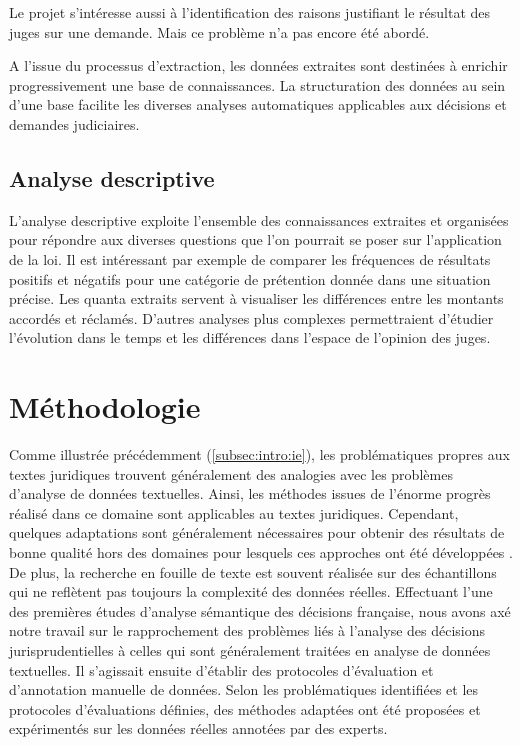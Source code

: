 Le projet s'intéresse aussi à l'identification des raisons justifiant le résultat des juges sur une demande. Mais ce problème n'a pas encore été abordé. 

A l'issue du processus d'extraction, les données extraites sont destinées à enrichir progressivement une base de connaissances. La structuration des données au sein d'une base facilite les diverses analyses automatiques applicables aux décisions et demandes judiciaires. 

\subsection{Analyse descriptive}
L'analyse descriptive exploite l'ensemble des connaissances extraites et organisées pour répondre aux diverses questions que l'on pourrait se poser sur l'application de la loi. Il est intéressant par exemple de comparer les fréquences de résultats positifs et négatifs pour une catégorie de prétention donnée dans une situation précise. Les quanta extraits servent à visualiser les différences entre les montants accordés et réclamés. D'autres analyses plus complexes permettraient d'étudier l'évolution dans le temps et les différences dans l'espace de l'opinion des juges.


\section{Méthodologie}
\label{sec:intro:methodologie}

Comme illustrée précédemment (\ref{subsec:intro:ie}), les problématiques propres aux textes juridiques trouvent généralement des analogies avec les problèmes d'analyse de données textuelles. Ainsi, les méthodes issues de l'énorme progrès réalisé dans ce domaine sont applicables au textes juridiques. Cependant, quelques adaptations sont généralement nécessaires pour obtenir des résultats de bonne qualité hors des domaines pour lesquels ces approches ont été développées \citep{Waltl2016lexia}. De plus, la recherche en fouille de texte est souvent réalisée sur des échantillons qui ne reflètent pas toujours la complexité des données réelles. Effectuant l'une des premières études d'analyse sémantique des décisions française, nous avons axé notre travail sur le rapprochement des problèmes liés à l'analyse des décisions jurisprudentielles à celles qui sont généralement traitées en analyse de données textuelles. Il s'agissait ensuite d'établir des protocoles d'évaluation et d'annotation manuelle de données. Selon les problématiques identifiées et les protocoles d'évaluations définies, des méthodes adaptées ont été proposées et expérimentés sur les données réelles annotées par des experts.

